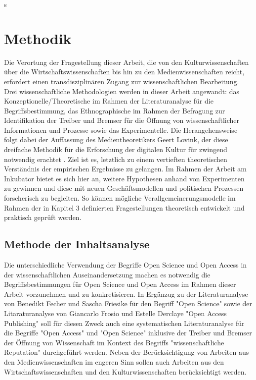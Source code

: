 s\chapter{Methodik}
Die Verortung der Fragestellung dieser Arbeit, die von den Kulturwissenschaften über die Wirtschaftswissenschaften bis hin zu den Medienwissenschaften reicht, erfordert einen transdisziplinären Zugang zur wissenschaftlichen Bearbeitung. 
Drei wissenschaftliche Methodologien werden in dieser Arbeit angewandt: das Konzeptionelle/Theoretische im Rahmen der Literaturanalyse für die Begriffsbestimmung, das Ethnographische im Rahmen der Befragung zur Identifikation der Treiber und Bremser für die Öffnung von wissenschaftlicher Informationen und Prozesse sowie das Experimentelle. 
Die Herangehensweise folgt dabei der Auffassung des Medientheoretikers Geert Lovink, der diese dreifache Methodik für die Erforschung der digitalen Kultur für zwingend notwendig erachtet . 
Ziel ist es, letztlich zu einem vertieften theoretischen Verständnis der empirischen Ergebnisse zu gelangen. Im Rahmen der Arbeit am Inkubator bietet es sich hier an, weitere Hypothesen anhand von Experimenten zu gewinnen und diese mit neuen Geschäftsmodellen und politischen Prozessen forscherisch zu begleiten. So können mögliche Verallgemeinerungsmodelle im Rahmen der in Kapitel 3 definierten Fragestellungen theoretisch entwickelt und praktisch geprüft werden.
\section{Methode der Inhaltsanalyse}
Die unterschiedliche Verwendung der Begriffe Open Science und Open Access in der wissenschaftlichen Auseinandersetzung machen es notwendig die Begriffsbestimmungen für Open Science und Open Access im Rahmen dieser Arbeit vorzunehmen und zu konkretisieren. In Ergänzug zu der Literaturanalyse von Benedikt Fecher und Sascha Friesike für den Begriff "Open Science"\cite{cite:9} sowie der Litaraturanalyse von Giancarlo Frosio und Estelle Derclaye "Open Access Publishing" \cite{CREATe_2014} soll für diesen Zweck auch eine systematischen Literaturanalyse für die Begriffe "Open Access" und "Open Science" inklusive der Treiber und Bremser der Öffnung von Wissenschaft im Kontext des Begriffs "wissenschaftliche Reputation" durchgeführt werden. Neben der Berücksichtigung von Arbeiten aus den Medienwissenschaften im engeren Sinn sollen auch Arbeiten aus den Wirtschaftswissenschaften und den Kulturwissenschaften berücksichtigt werden.
